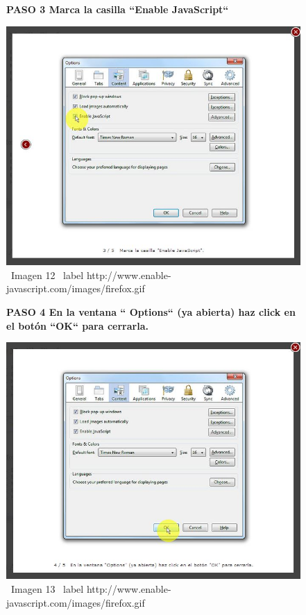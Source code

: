 \documentclass[11pt]{article} %
\begin{document}
\begin{figure}
\begin{center}

\begin{center}
\bf PASO 3
Marca la casilla ``Enable JavaScript``
\newline
\end{center}
\includegraphics[height=8 cm, width=8 cm] {imagenes/firefox 03.JPG}
\newline
\newline
\ Imagen 12
\ label {http://www.enable-javascript.com/images/firefox.gif }

\begin{center}
\bf PASO 4
En la ventana `` Options`` (ya abierta) haz click en el botón ``OK`` para cerrarla.
\end{center}
\includegraphics[height=8 cm, width=8 cm] {imagenes/firefox 04.JPG}
\newline
\newline
\ Imagen 13
\ label {http://www.enable-javascript.com/images/firefox.gif }

\end{center}
\end{figure}
\end{document}
